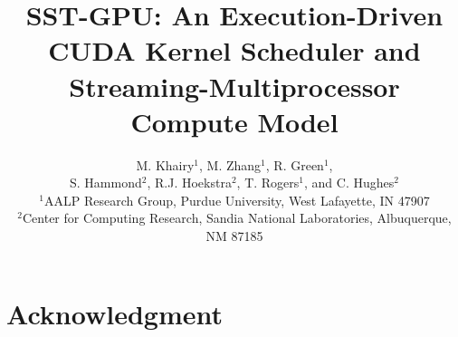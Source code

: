 \documentclass[pdf,ps2pdf,12pt,report,strict,blank]{SANDreport}
\title{SST-GPU: An Execution-Driven \\CUDA Kernel Scheduler and Streaming-Multiprocessor \\Compute Model}
\author{M. Khairy$^1$, M. Zhang$^1$, R. Green$^1$,\\
            S. Hammond$^2$, R.J. Hoekstra$^2$, T. Rogers$^1$, and C. Hughes$^2$ \\
            \small{$^1$AALP Research Group, Purdue University, West Lafayette, IN 47907} \\
            \small{$^2$Center for Computing Research, Sandia National Laboratories, Albuquerque, NM 87185} \\
           }
\date{}
\begin{document}
    \maketitle

    \begin{abstract}
	
    \end{abstract}


    \clearpage
       \chapter*{Acknowledgment}
    


    \cleardoublepage		%
    \tableofcontents
    \listoffigures


% 	


% 	


    \clearpage
\end{document}
